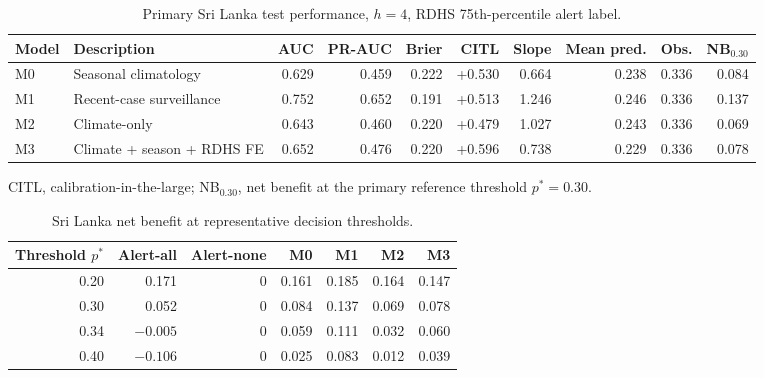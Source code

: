 \documentclass[11pt,a4paper]{article}
\begin{document}
\begin{table}[htbp]
\centering
\caption{Primary Sri Lanka test performance, $h=4$, RDHS 75th-percentile alert label.}
\label{tab:slprimary}
\begin{threeparttable}\small
\begin{tabular}{llrrrrrrrr}
\toprule
Model & Description & AUC & PR-AUC & Brier & CITL & Slope & Mean pred. & Obs. & NB$_{0.30}$ \\
\midrule
M0 & Seasonal climatology & 0.629 & 0.459 & 0.222 & +0.530 & 0.664 & 0.238 & 0.336 & 0.084 \\
M1 & Recent-case surveillance & 0.752 & 0.652 & 0.191 & +0.513 & 1.246 & 0.246 & 0.336 & 0.137 \\
M2 & Climate-only & 0.643 & 0.460 & 0.220 & +0.479 & 1.027 & 0.243 & 0.336 & 0.069 \\
M3 & Climate + season + RDHS FE & 0.652 & 0.476 & 0.220 & +0.596 & 0.738 & 0.229 & 0.336 & 0.078 \\
\bottomrule
\end{tabular}
\begin{tablenotes}\footnotesize
\item CITL, calibration-in-the-large; NB$_{0.30}$, net benefit at the primary reference threshold $p^*=0.30$.
\end{tablenotes}
\end{threeparttable}
\end{table}

\begin{table}[htbp]
\centering
\caption{Sri Lanka net benefit at representative decision thresholds.}
\label{tab:slthresh}
\small
\begin{tabular}{rrrrrrr}
\toprule
Threshold $p^*$ & Alert-all & Alert-none & M0 & M1 & M2 & M3 \\
\midrule
0.20 & 0.171 & 0 & 0.161 & 0.185 & 0.164 & 0.147 \\
0.30 & 0.052 & 0 & 0.084 & 0.137 & 0.069 & 0.078 \\
0.34 & $-0.005$ & 0 & 0.059 & 0.111 & 0.032 & 0.060 \\
0.40 & $-0.106$ & 0 & 0.025 & 0.083 & 0.012 & 0.039 \\
\bottomrule
\end{tabular}
\end{table}
\end{document}
